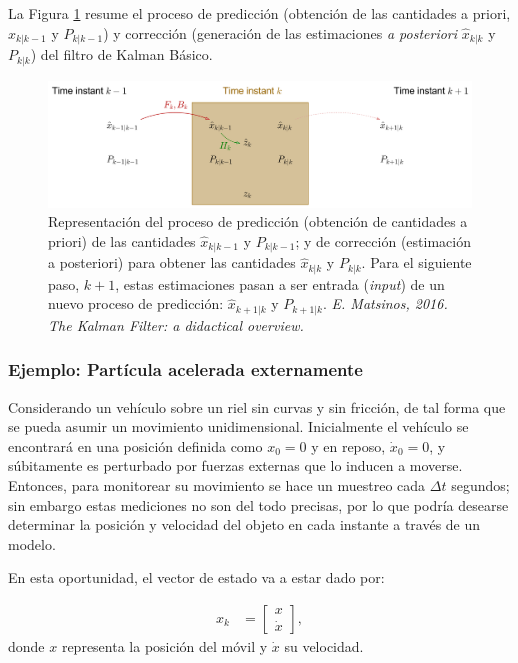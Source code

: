 La Figura \ref{fig:kfb} resume el proceso de predicci\'on (obtenci\'on de las cantidades a priori, $\hat{x}_{k|k-1}$ y $P_{k|k-1}$) y correcci\'on (generaci\'on de las estimaciones \textit{a posteriori}  $\hat{x}_{k|k}$ y $P_{k|k}$) del filtro de Kalman B\'asico. 

\begin{figure}[h!]
\centering
\includegraphics[scale=0.5]{images/kfb}
\caption{Representaci\'on del proceso de predicci\'on (obtenci\'on de cantidades a priori) de las cantidades $\hat{x}_{k|k-1}$ y $P_{k|k-1}$;  y de correcci\'on (estimaci\'on a posteriori) para obtener las cantidades $\hat{x}_{k|k}$ y $P_{k|k}$. Para el siguiente paso, $k+1$, estas estimaciones pasan a ser entrada (\textit{input}) de un nuevo proceso de predicci\'on: $\hat{x}_{k+1|k}$ y $P_{k+1|k}$. \textit{E. Matsinos, 2016. The Kalman Filter: a didactical overview.}}
\label{fig:kfb}
\end{figure}
\subsubsection{Ejemplo: Part\'icula acelerada externamente}
Considerando un veh\'iculo sobre un riel sin curvas y sin fricci\'on, de tal forma que se pueda asumir un movimiento unidimensional. Inicialmente el veh\'iculo se encontrar\'a en una posici\'on definida como $x_0=0$ y en reposo, $\dot{x}_0=0$, y s\'ubitamente es perturbado por fuerzas externas que lo inducen a moverse. Entonces, para monitorear su movimiento se hace un muestreo cada $\Delta t$ segundos; sin embargo estas mediciones no son del todo precisas, por lo que podr\'ia desearse determinar la posici\'on y velocidad del objeto en cada instante a trav\'es de un modelo.
\bigskip

En esta oportunidad, el vector de estado va a estar dado por:

\begin{align}
x_k &= \begin{bmatrix}
x\\ \dot{x}
\end{bmatrix},
\label{eq:example_state} 
\end{align} 
donde $x$ representa la posici\'on del m\'ovil y $\dot{x}$ su velocidad.
\bigskip

